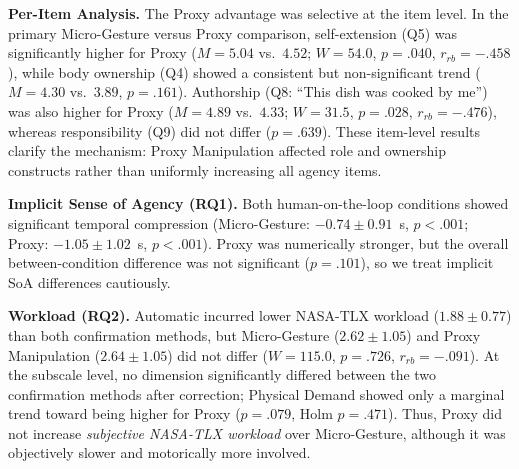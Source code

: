 \documentclass[sigconf,review,anonymous]{acmart}
\begin{document}
%
%
%
%
\textbf{Per-Item Analysis.}
The Proxy advantage was selective at the item level. In the primary Micro-Gesture versus Proxy comparison, self-extension (Q5) was significantly higher for Proxy ($M=5.04$ vs.\ $4.52$; $W=54.0$, $p=.040$, $r_{rb}=-.458$), while body ownership (Q4) showed a consistent but non-significant trend ($M=4.30$ vs.\ $3.89$, $p=.161$). Authorship (Q8: ``This dish was cooked by me'') was also higher for Proxy ($M=4.89$ vs.\ $4.33$; $W=31.5$, $p=.028$, $r_{rb}=-.476$), whereas responsibility (Q9) did not differ ($p=.639$). These item-level results clarify the mechanism: Proxy Manipulation affected role and ownership constructs rather than uniformly increasing all agency items.

\textbf{Implicit Sense of Agency (RQ1).}
Both human-on-the-loop conditions showed significant temporal compression (Micro-Gesture: $-0.74 \pm 0.91$~s, $p<.001$; Proxy: $-1.05 \pm 1.02$~s, $p<.001$). Proxy was numerically stronger, but the overall between-condition difference was not significant ($p=.101$), so we treat implicit SoA differences cautiously.

\textbf{Workload (RQ2).}
Automatic incurred lower NASA-TLX workload ($1.88 \pm 0.77$) than both confirmation methods, but Micro-Gesture ($2.62 \pm 1.05$) and Proxy Manipulation ($2.64 \pm 1.05$) did not differ ($W=115.0$, $p=.726$, $r_{rb}=-.091$). At the subscale level, no dimension significantly differed between the two confirmation methods after correction; Physical Demand showed only a marginal trend toward being higher for Proxy ($p=.079$, Holm $p=.471$). Thus, Proxy did not increase \emph{subjective NASA-TLX workload} over Micro-Gesture, although it was objectively slower and motorically more involved.
\end{document}
